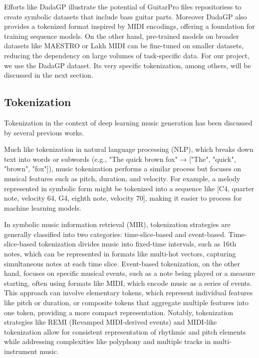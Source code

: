 Efforts like DadaGP illustrate the potential of GuitarPro files repositoriess to create symbolic datasets that include bass guitar parts.
Moreover DadaGP also provides a tokenized format inspired by MIDI encodings, offering a foundation for training sequence models.
On the other hand, pre-trained models on broader datasets like MAESTRO or Lakh MIDI can be fine-tuned on smaller datasets, reducing the dependency on large volumes of task-specific data\cite{makris_conditional_2022, sarmento_dadagp_2021}.
For our project, we use the DadaGP dataset. Its very specific tokenization, among others, will be discussed in the next section.


\subsection{Tokenization}

Tokenization in the context of deep learning music generation has been discussed by several previous works\cite{agarwal_structure-informed_2024, makris_conditional_2022, sarmento_dadagp_2021, hsiao_compound_2021, cournut_encodages_2020}.

Much like tokenization in natural language processing (NLP), which breaks down text into words or subwords (e.g., "The quick brown fox" → ["The", "quick", "brown", "fox"]),
music tokenization performs a similar process but focuses on musical features such as pitch, duration, and velocity.
For example, a melody represented in symbolic form might be tokenized into a sequence like [C4, quarter note, velocity 64, G4, eighth note, velocity 70], making it easier to process for machine learning models.

In symbolic music information retrieval (MIR), tokenization strategies are generally classified into two categories: time-slice-based and event-based\cite{le_natural_2024}.
Time-slice-based tokenization divides music into fixed-time intervals, such as 16th notes, which can be represented in formats like multi-hot vectors, capturing simultaneous notes at each time slice.
Event-based tokenization, on the other hand, focuses on specific musical events, such as a note being played or a measure starting, often using formats like MIDI, which encode music as a series of events.
This approach can involve elementary tokens, which represent individual features like pitch or duration, or composite tokens that aggregate multiple features into one token, providing a more compact representation.
Notably, tokenization strategies like REMI (Revamped MIDI-derived events\cite{huang_pop_2020}) and MIDI-like tokenization allow for consistent representation of rhythmic and pitch elements while addressing complexities like polyphony and multiple tracks in multi-instrument music\cite{le_natural_2024, cournut_encodages_2020}.

